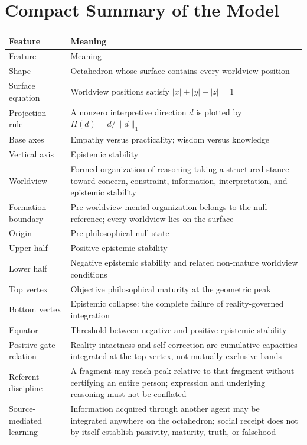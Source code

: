 \documentclass[11pt]{article}
\begin{document}
\appendix

\section{Compact Summary of the Model}

\begin{longtable}{>{\raggedright\arraybackslash}p{3.0cm} >{\raggedright\arraybackslash}p{10.5cm}}
\toprule
Feature & Meaning \\
\midrule
\endfirsthead
\toprule
Feature & Meaning \\
\midrule
\endhead
Shape & Octahedron whose surface contains every worldview position \\
Surface equation & Worldview positions satisfy $|x|+|y|+|z|=1$ \\
Projection rule & A nonzero interpretive direction $d$ is plotted by $\Pi(d)=d/\|d\|_1$ \\
Base axes & Empathy versus practicality; wisdom versus knowledge \\
Vertical axis & Epistemic stability \\
Worldview & Formed organization of reasoning taking a structured stance toward concern, constraint, information, interpretation, and epistemic stability \\
Formation boundary & Pre-worldview mental organization belongs to the null reference; every worldview lies on the surface \\
Origin & Pre-philosophical null state \\
Upper half & Positive epistemic stability \\
Lower half & Negative epistemic stability and related non-mature worldview conditions \\
Top vertex & Objective philosophical maturity at the geometric peak \\
Bottom vertex & Epistemic collapse: the complete failure of reality-governed integration \\
Equator & Threshold between negative and positive epistemic stability \\
Positive-gate relation & Reality-intactness and self-correction are cumulative capacities integrated at the top vertex, not mutually exclusive bands \\
Referent discipline & A fragment may reach peak relative to that fragment without certifying an entire person; expression and underlying reasoning must not be conflated \\
Source-mediated learning & Information acquired through another agent may be integrated anywhere on the octahedron; social receipt does not by itself establish passivity, maturity, truth, or falsehood \\

\end{longtable}
\end{document}
